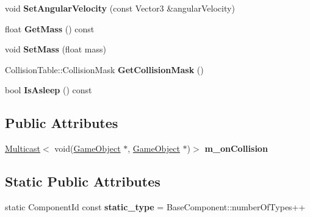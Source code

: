 \begin{DoxyCompactItemize}
void {\bfseries Set\+Angular\+Velocity} (const Vector3 \&angular\+Velocity)
\item 
\mbox{\label{classRigidbodyComponent_acf62ca0b197641a3e536e38e5b90f0b1}} 
float {\bfseries Get\+Mass} () const
\item 
\mbox{\label{classRigidbodyComponent_a9e75d7dfef39fcccdd9ddf7416188d57}} 
void {\bfseries Set\+Mass} (float mass)
\item 
\mbox{\label{classRigidbodyComponent_a6b7cc610ebeac138cddc580c746e3eb2}} 
Collision\+Table\+::\+Collision\+Mask {\bfseries Get\+Collision\+Mask} ()
\item 
\mbox{\label{classRigidbodyComponent_a5ea94f888c37f71c6e7206b0497f1bc8}} 
bool {\bfseries Is\+Asleep} () const
\end{DoxyCompactItemize}
\subsection*{Public Attributes}
\begin{DoxyCompactItemize}
\item 
\mbox{\label{classRigidbodyComponent_a0e5df88cd54f006fca8de1383a4dd1ad}} 
\hyperlink{classMulticast}{Multicast}$<$ void(\hyperlink{classGameObject}{Game\+Object} $\ast$, \hyperlink{classGameObject}{Game\+Object} $\ast$)$>$ {\bfseries m\+\_\+on\+Collision}
\end{DoxyCompactItemize}
\subsection*{Static Public Attributes}
\begin{DoxyCompactItemize}
\item 
\mbox{\label{classRigidbodyComponent_af221dd26ffa3afa7eddb139cba1821f6}} 
static Component\+Id const {\bfseries static\+\_\+type} = Base\+Component\+::number\+Of\+Types++
\end{DoxyCompactItemize}
